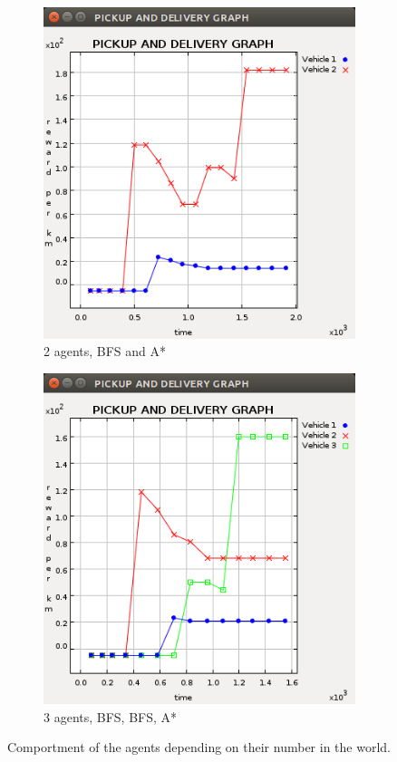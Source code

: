 \documentclass[11pt]{article}
\begin{document}
\begin{figure}
\begin{subfigure}[b]{0.3\textwidth}
    \includegraphics[width=\textwidth]{2agentsBFSASTAR.png}
    \caption{2 agents, BFS and A*}
    \label{img:2agents}
  \end{subfigure}
  \begin{subfigure}[b]{0.3\textwidth}
    \includegraphics[width=\textwidth]{3agentsBBA.png}
    \caption{3 agents, BFS, BFS, A*}
    \label{img:3agents}
  \end{subfigure}
  \caption{Comportment of the agents depending on their number in the world.}
  \label{img:multipleAgent}
\end{figure}
\end{document}

